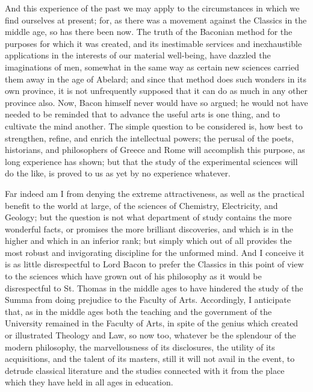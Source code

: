 And this experience of the past we may apply to the circumstances in which we find ourselves at present; for, as there was
a movement against the Classics in the middle age, so has there been
now. The truth of the Baconian method for the purposes for which it
was created, and its inestimable services and inexhaustible
applications in the interests of our material well-being, have dazzled
the imaginations of men, somewhat in the same way as certain new
sciences carried them away in the age of Abelard; and since that
method does such wonders in its own province, it is not unfrequently
supposed that it can do as much in any other province also. Now, Bacon
himself never would have so argued; he would not have needed to be
reminded that to advance the useful arts is one thing, and to
cultivate the mind another. The simple question to be considered is,
how best to strengthen, refine, and enrich the intellectual powers;
the perusal of the poets, historians, and philosophers of Greece and
Rome will accomplish this purpose, as long experience has shown; but
that the study of the experimental sciences will do the like, is
proved to us as yet by no experience whatever.

Far indeed am I from denying the extreme attractiveness, as well as
the practical benefit to the world at large, of the sciences of
Chemistry, Electricity, and Geology; but the question is not what
department of study contains the more wonderful facts, or promises the
more brilliant discoveries, and which is in the higher and which in an
inferior rank; but simply which out of all provides the most robust
and invigorating discipline for the unformed mind. And I conceive it
is as little disrespectful to Lord Bacon to prefer the Classics in
this point of view to the sciences which have grown out of his
philosophy as it would be disrespectful to St. Thomas in the middle
ages to have hindered the study of the Summa from doing
prejudice to the Faculty of Arts. Accordingly, I anticipate that, as
in the middle ages both the teaching and the government of the
University remained in the Faculty of Arts, in spite of the genius
which created or illustrated Theology and Law, so now too, whatever be
the splendour of the modern philosophy, the marvellousness of its
disclosures, the utility of its acquisitions, and the talent of its
masters, still it will not avail in the event, to detrude classical
literature and the studies connected with it from the place which they
have held in all ages in education.


